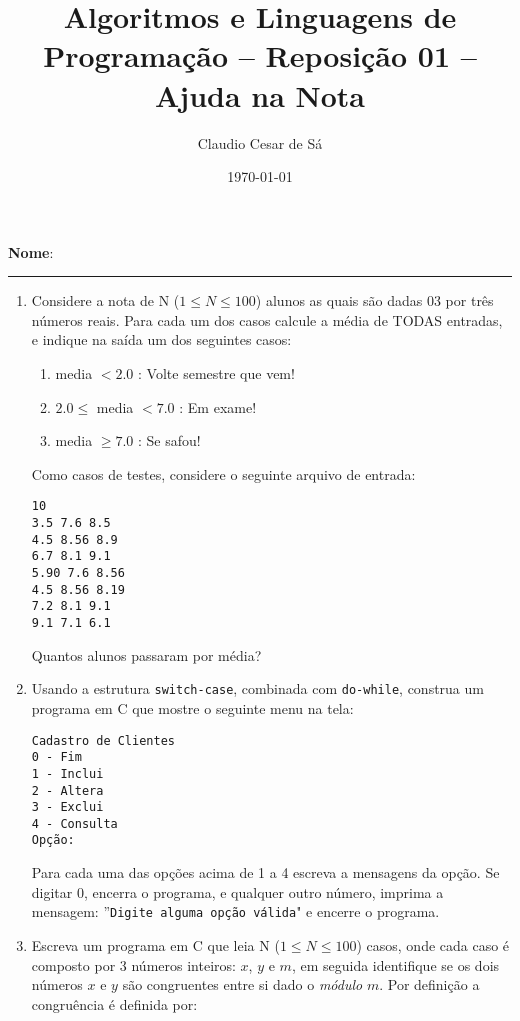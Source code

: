 \documentclass[12pt]{article}
\title{Algoritmos e Linguagens de Programação --  Reposição 01 -- Ajuda na Nota}
\author{ Claudio Cesar de Sá}
\date{\today}
\begin{document}
\maketitle



\begin{flushleft}
\textbf{Nome}: \rule{10cm}{0.3mm} 
\end{flushleft}
\begin{enumerate}

\item Considere a nota de N  ($1 \le N \le 100$)  alunos as quais são dadas 03
por três números reais. Para cada um dos casos 
calcule a média  de TODAS entradas, e indique na saída um dos seguintes casos:

\begin{enumerate}
  \item media $< 2.0$ : Volte semestre que vem!
    \item $2.0 \le$ media $< 7.0$ : Em exame!
        \item media $\ge 7.0$ : Se safou!
\end{enumerate}
Como  casos de testes, considere o seguinte arquivo de entrada:
\begin{verbatim}
10
3.5 7.6 8.5
4.5 8.56 8.9
6.7 8.1 9.1
5.90 7.6 8.56
4.5 8.56 8.19
7.2 8.1 9.1
9.1 7.1 6.1
\end{verbatim}
Quantos alunos passaram por média?


\item Usando a estrutura \texttt{switch-case}, combinada com \texttt{do-while}, construa um programa em C que mostre o seguinte menu na tela:
\begin{small}
\begin{verbatim}
Cadastro de Clientes
0 - Fim
1 - Inclui
2 - Altera
3 - Exclui
4 - Consulta
Opção: 
\end{verbatim}
\end{small}

Para cada uma das opções acima de 1 a 4 escreva a mensagens da opção. Se digitar 0,
encerra o programa, e qualquer outro número, imprima a mensagem: ''\texttt{Digite alguma opção
válida}"\/ e encerre o programa.

\item  Escreva um programa em C que leia N ($1 \le N \le 100$)  casos, onde cada caso é composto por
 3 números inteiros: $x$, $y$ e $m$, em seguida identifique se os dois números  $x$ e $y$ são congruentes
entre si dado o \textit{módulo} $m$. Por definição
a congruência é definida por:


\end{enumerate}
\end{document}
